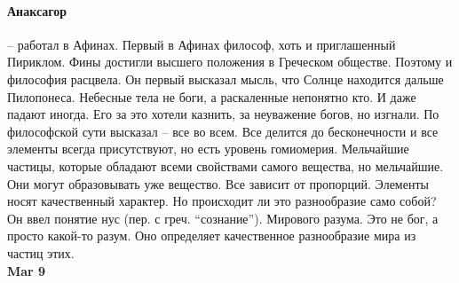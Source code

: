 \documentclass[a4paper, 12pt]{article}
\begin{document}
\paragraph{Анаксагор} -- работал в Афинах. Первый в Афинах философ, хоть и приглашенный Пириклом. Фины достигли высшего положения в Греческом обществе. Поэтому и философия расцвела. Он первый высказал мысль, что Солнце находится дальше Пилопонеса. Небесные тела не боги, а раскаленные непонятно кто. И даже падают иногда. Его за это хотели казнить, за неуважение богов, но изгнали. По философской сути высказал -- все во всем. Все делится до бесконечности и все элементы всегда присутствуют, но есть уровень гомиомерия. Мельчайшие частицы, которые обладают всеми свойствами самого вещества, но мельчайшие. Они могут образовывать уже вещество. Все зависит от пропорций. Элементы носят качественный характер. Но происходит ли это разнообразие само собой? Он ввел понятие нус (пер. с греч. ``сознание''). Мирового разума. Это не бог, а просто какой-то разум. Оно определяет качественное разнообразие мира из частиц этих. 
\\

\hfill \textbf{Mar 9}
\end{document}
